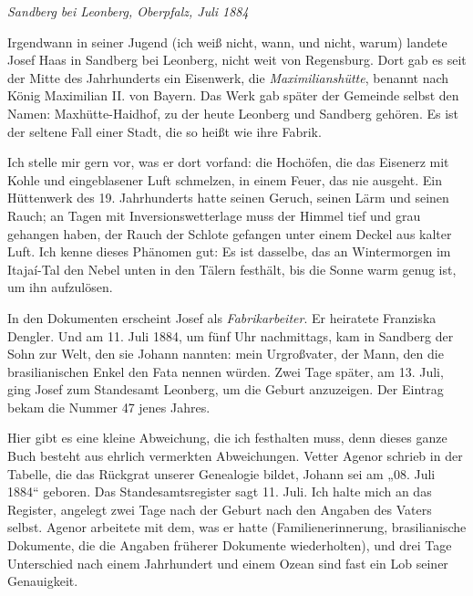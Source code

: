 \documentclass[
  ngerman,
  11pt,
  openany]{book}
\begin{document}
\emph{Sandberg bei Leonberg, Oberpfalz, Juli 1884}

Irgendwann in seiner Jugend (ich weiß nicht, wann, und nicht, warum)
landete Josef Haas in Sandberg bei Leonberg, nicht weit von Regensburg.
Dort gab es seit der Mitte des Jahrhunderts ein Eisenwerk, die
\emph{Maximilianshütte}, benannt nach König Maximilian II. von Bayern.
Das Werk gab später der Gemeinde selbst den Namen: Maxhütte-Haidhof, zu
der heute Leonberg und Sandberg gehören. Es ist der seltene Fall einer
Stadt, die so heißt wie ihre Fabrik.

Ich stelle mir gern vor, was er dort vorfand: die Hochöfen, die das
Eisenerz mit Kohle und eingeblasener Luft schmelzen, in einem Feuer, das
nie ausgeht. Ein Hüttenwerk des 19. Jahrhunderts hatte seinen Geruch,
seinen Lärm und seinen Rauch; an Tagen mit Inversionswetterlage muss der
Himmel tief und grau gehangen haben, der Rauch der Schlote gefangen
unter einem Deckel aus kalter Luft. Ich kenne dieses Phänomen gut: Es
ist dasselbe, das an Wintermorgen im Itajaí-Tal den Nebel unten in den
Tälern festhält, bis die Sonne warm genug ist, um ihn aufzulösen.

In den Dokumenten erscheint Josef als \emph{Fabrikarbeiter}. Er
heiratete Franziska Dengler. Und am 11. Juli 1884, um fünf Uhr
nachmittags, kam in Sandberg der Sohn zur Welt, den sie Johann nannten:
mein Urgroßvater, der Mann, den die brasilianischen Enkel den Fata
nennen würden. Zwei Tage später, am 13. Juli, ging Josef zum Standesamt
Leonberg, um die Geburt anzuzeigen. Der Eintrag bekam die Nummer 47
jenes Jahres.

Hier gibt es eine kleine Abweichung, die ich festhalten muss, denn
dieses ganze Buch besteht aus ehrlich vermerkten Abweichungen. Vetter
Agenor schrieb in der Tabelle, die das Rückgrat unserer Genealogie
bildet, Johann sei am „08. Juli 1884`` geboren. Das Standesamtsregister
sagt 11. Juli. Ich halte mich an das Register, angelegt zwei Tage nach
der Geburt nach den Angaben des Vaters selbst. Agenor arbeitete mit dem,
was er hatte (Familienerinnerung, brasilianische Dokumente, die die
Angaben früherer Dokumente wiederholten), und drei Tage Unterschied nach
einem Jahrhundert und einem Ozean sind fast ein Lob seiner Genauigkeit.
\end{document}
